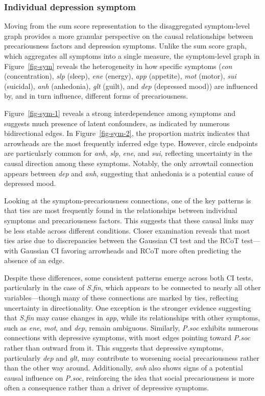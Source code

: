 \documentclass[
]{article}
\begin{document}
\subsubsection{Individual depression
symptom}\label{individual-depression-symptom}

Moving from the sum score representation to the disaggregated
symptom-level graph provides a more granular perspective on the causal
relationships between precariousness factors and depression symptoms.
Unlike the sum score graph, which aggregates all symptoms into a single
measure, the symptom-level graph in Figure~\ref{fig-sym} reveals the
heterogeneity in how specific symptoms (\emph{con} (concentration),
\emph{slp} (sleep), \emph{ene} (energy), \emph{app} (appetite),
\emph{mot} (motor), \emph{sui} (suicidal), \emph{anh} (anhedonia),
\emph{glt} (guilt), and \emph{dep} (depressed mood)) are influenced by,
and in turn influence, different forms of precariousness.

Figure~\ref{fig-sym-1} reveals a strong interdependence among symptoms
and suggests much presence of latent confounders, as indicated by
numerous bidirectional edges. In Figure~\ref{fig-sym-2}, the proportion
matrix indicates that arrowheads are the most frequently inferred edge
type. However, circle endpoints are particularly common for \emph{anh},
\emph{slp}, \emph{ene}, and \emph{sui}, reflecting uncertainty in the
causal direction among these symptoms. Notably, the only arrowtail
connection appears between \emph{dep} and \emph{anh}, suggesting that
anhedonia is a potential cause of depressed mood.

Looking at the symptom-precariousness connections, one of the key
patterns is that ties are most frequently found in the relationships
between individual symptoms and precariousness factors. This suggests
that these causal links may be less stable across different conditions.
Closer examination reveals that most ties arise due to discrepancies
between the Gaussian CI test and the RCoT test---with Gaussian CI
favoring arrowheads and RCoT more often predicting the absence of an
edge.

Despite these differences, some consistent patterns emerge across both
CI tests, particularly in the case of \emph{S.fin}, which appears to be
connected to nearly all other variables---though many of these
connections are marked by ties, reflecting uncertainty in
directionality. One exception is the stronger evidence suggesting that
\emph{S.fin} may cause changes in \emph{app}, while its relationships
with other symptoms, such as \emph{ene}, \emph{mot}, and \emph{dep},
remain ambiguous. Similarly, \emph{P.soc} exhibits numerous connections
with depressive symptoms, with most edges pointing toward \emph{P.soc}
rather than outward from it. This suggests that depressive symptoms,
particularly \emph{dep} and \emph{glt}, may contribute to worsening
social precariousness rather than the other way around. Additionally,
\emph{anh} also shows signs of a potential causal influence on
\emph{P.soc}, reinforcing the idea that social precariousness is more
often a consequence rather than a driver of depressive symptoms.
\end{document}
